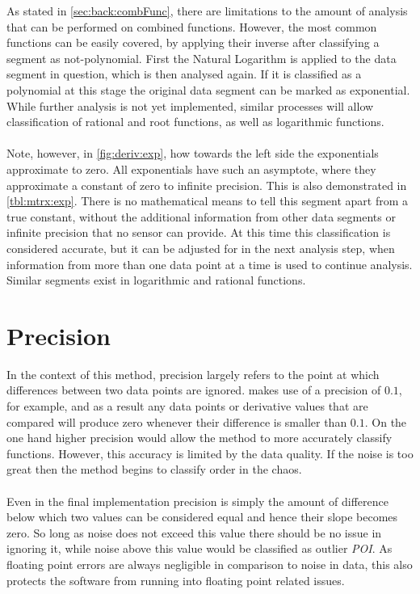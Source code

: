 \documentclass[main.tex]{subfiles}
\begin{document}
      As stated in \cref{sec:back:combFunc}, there are limitations to the amount of analysis that can be performed on combined functions. However, the most common functions can be easily covered, by applying their inverse after classifying a segment as not-polynomial. First the Natural Logarithm is applied to the data segment in question, which is then analysed again. If it is classified as a polynomial at this stage the original data segment can be marked as exponential. While further analysis is not yet implemented, similar processes will allow classification of rational and root functions, as well as logarithmic functions.
      \\\\
      Note, however, in \cref{fig:deriv:exp}, how towards the left side the exponentials approximate to zero. All exponentials have such an asymptote, where they approximate a constant of zero to infinite precision. This is also demonstrated in \cref{tbl:mtrx:exp}. There is no mathematical means to tell this segment apart from a true constant, without the additional information from other data segments or infinite precision that no sensor can provide. At this time this classification is considered accurate, but it can be adjusted for in the next analysis step, when information from more than one data point at a time is used to continue analysis. Similar segments exist in logarithmic and rational functions.
      
      
      
  \section{Precision}
    
    In the context of this method, precision largely refers to the point at which differences between two data points are ignored.  makes use of a precision of $0.1$, for example, and as a result any data points or derivative values that are compared will produce zero whenever their difference is smaller than $0.1$. On the one hand higher precision would allow the method to more accurately classify functions. However, this accuracy is limited by the data quality. If the noise is too great then the method begins to classify order in the chaos. 
    \\\\
    Even in the final implementation precision is simply the amount of difference below which two values can be considered equal and hence their slope becomes zero. So long as noise does not exceed this value there should be no issue in ignoring it, while noise above this value would be classified as outlier \textit{POI}. As floating point errors are always negligible in comparison to noise in data, this also protects the software from running into floating point related issues.
%    
  
\end{document}
